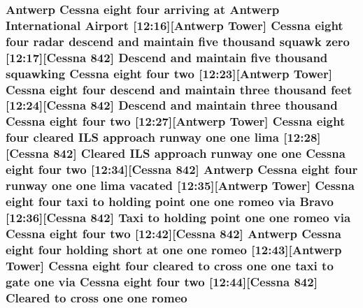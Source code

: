 \subsubsection[{\texorpdfstring{romeo}{romeo}}]{\setlength{\rightskip}{0pt plus 5cm}Antwerp {\bf Cessna} eight four arriving at Antwerp International {\bf Airport} \mbox{[}12\+:16\mbox{]}\mbox{[}Antwerp {\bf Tower}\mbox{]} {\bf Cessna} eight four radar descend and maintain five {\bf thousand} squawk {\bf zero} \mbox{[}12\+:17\mbox{]}\mbox{[}{\bf Cessna} 842\mbox{]} Descend and maintain five {\bf thousand} {\bf squawking} {\bf Cessna} eight four {\bf two} \mbox{[}12\+:23\mbox{]}\mbox{[}Antwerp {\bf Tower}\mbox{]} {\bf Cessna} eight four descend and maintain three {\bf thousand} {\bf feet} \mbox{[}12\+:24\mbox{]}\mbox{[}{\bf Cessna} 842\mbox{]} Descend and maintain three {\bf thousand} {\bf Cessna} eight four {\bf two} \mbox{[}12\+:27\mbox{]}\mbox{[}Antwerp {\bf Tower}\mbox{]} {\bf Cessna} eight four cleared I\+LS approach runway {\bf one} {\bf one} {\bf lima} \mbox{[}12\+:28\mbox{]}\mbox{[}{\bf Cessna} 842\mbox{]} Cleared I\+LS approach runway {\bf one} {\bf one} {\bf Cessna} eight four {\bf two} \mbox{[}12\+:34\mbox{]}\mbox{[}{\bf Cessna} 842\mbox{]} Antwerp {\bf Cessna} eight four runway {\bf one} {\bf one} {\bf lima} vacated \mbox{[}12\+:35\mbox{]}\mbox{[}Antwerp {\bf Tower}\mbox{]} {\bf Cessna} eight four taxi to holding point {\bf one} {\bf one} romeo via {\bf Bravo} \mbox{[}12\+:36\mbox{]}\mbox{[}{\bf Cessna} 842\mbox{]} Taxi to holding point {\bf one} {\bf one} romeo via {\bf Cessna} eight four {\bf two} \mbox{[}12\+:42\mbox{]}\mbox{[}{\bf Cessna} 842\mbox{]} Antwerp {\bf Cessna} eight four holding short at {\bf one} {\bf one} romeo \mbox{[}12\+:43\mbox{]}\mbox{[}Antwerp {\bf Tower}\mbox{]} {\bf Cessna} eight four cleared to cross {\bf one} {\bf one} taxi to gate {\bf one} via {\bf Cessna} eight four {\bf two} \mbox{[}12\+:44\mbox{]}\mbox{[}{\bf Cessna} 842\mbox{]} Cleared to cross {\bf one} {\bf one} romeo}\hypertarget{happyDay2ATC_8txt_a62f290627a5be640635e9ce3b0df1027}{}\label{happyDay2ATC_8txt_a62f290627a5be640635e9ce3b0df1027}
